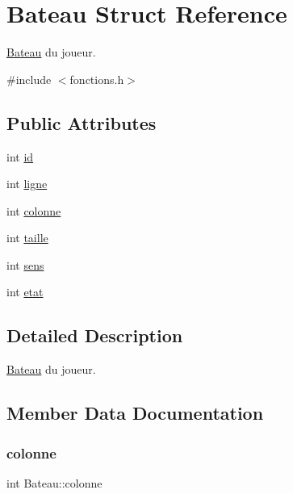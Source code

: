 \hypertarget{structBateau}{}\section{Bateau Struct Reference}
\label{structBateau}


\hyperlink{structBateau}{Bateau} du joueur.  




{\ttfamily \#include $<$fonctions.\+h$>$}

\subsection*{Public Attributes}
\begin{DoxyCompactItemize}
\item 
int \hyperlink{structBateau_afc8b5863d722d86e00511dcae976220d}{id}
\item 
int \hyperlink{structBateau_ae8d7a76573b9e27c1e72a15832b9d6f3}{ligne}
\item 
int \hyperlink{structBateau_abbe487a77be892bdf087c1b146c957d6}{colonne}
\item 
int \hyperlink{structBateau_a1dd818ea44eed67f756400eaac344a95}{taille}
\item 
int \hyperlink{structBateau_a887a8ad2ee59ffd987eb5f9d117e83a2}{sens}
\item 
int \hyperlink{structBateau_a43f12f415c28f4dbd4f28808b9fc1e51}{etat}
\end{DoxyCompactItemize}


\subsection{Detailed Description}
\hyperlink{structBateau}{Bateau} du joueur. 

\subsection{Member Data Documentation}
\hypertarget{structBateau_abbe487a77be892bdf087c1b146c957d6}{}\label{structBateau_abbe487a77be892bdf087c1b146c957d6} 
\subsubsection{\texorpdfstring{colonne}{colonne}}
{\footnotesize\ttfamily int Bateau\+::colonne}

\hypertarget{structBateau_a43f12f415c28f4dbd4f28808b9fc1e51}{}\label{structBateau_a43f12f415c28f4dbd4f28808b9fc1e51} 
